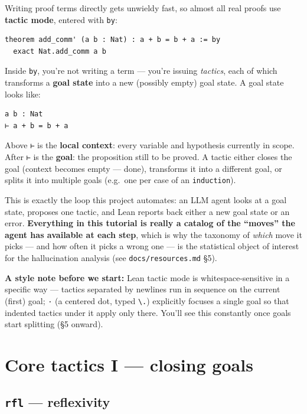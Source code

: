 Writing proof terms directly gets unwieldy fast, so almost all real proofs use \textbf{tactic mode}, entered with \texttt{by}:

\begin{verbatim}
theorem add_comm' (a b : Nat) : a + b = b + a := by
  exact Nat.add_comm a b
\end{verbatim}

Inside \texttt{by}, you're not writing a term --- you're issuing \emph{tactics}, each of which transforms a \textbf{goal state} into a new (possibly empty) goal state. A goal state looks like:

\begin{verbatim}
a b : Nat
⊢ a + b = b + a
\end{verbatim}

Above \texttt{⊢} is the \textbf{local context}: every variable and hypothesis currently in scope. After \texttt{⊢} is the \textbf{goal}: the proposition still to be proved. A tactic either closes the goal (context becomes empty --- done), transforms it into a different goal, or splits it into multiple goals (e.g.\ one per case of an \texttt{induction}).

This is exactly the loop this project automates: an LLM agent looks at a goal state, proposes one tactic, and Lean reports back either a new goal state or an error. \textbf{Everything in this tutorial is really a catalog of the ``moves'' the agent has available at each step}, which is why the taxonomy of \emph{which} move it picks --- and how often it picks a wrong one --- is the statistical object of interest for the hallucination analysis (see \texttt{docs/resources.md} \S5).

\textbf{A style note before we start:} Lean tactic mode is whitespace-sensitive in a specific way --- tactics separated by newlines run in sequence on the current (first) goal; \texttt{·} (a centered dot, typed \texttt{\textbackslash{}.}) explicitly focuses a single goal so that indented tactics under it apply only there. You'll see this constantly once goals start splitting (\S5 onward).

\section{Core tactics I --- closing goals}

\subsection{\texttt{rfl} --- reflexivity}


